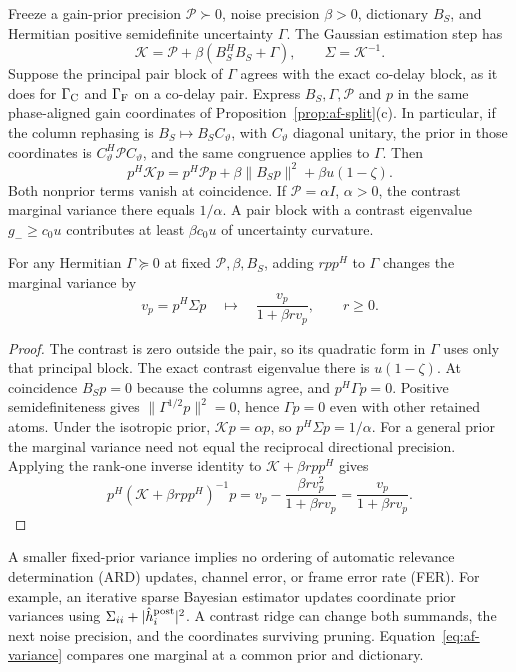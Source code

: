 \begin{afdmcor}
\label{cor:af-prior}
Freeze a gain-prior precision $\mathcal P\succ0$, noise precision
$\beta>0$, dictionary $B_S$, and Hermitian positive semidefinite
uncertainty $\Gamma$. The Gaussian estimation step has
\[
 \mathcal K=\mathcal P+\beta(B_S^HB_S+\Gamma),\qquad
 \Sigma=\mathcal K^{-1}.
\]
Suppose the principal pair block of $\Gamma$ agrees with the exact
co-delay block, as it does for $\Gamma_{\rm C}$ and $\Gamma_{\rm F}$
on a co-delay pair. Express $B_S,\Gamma,\mathcal P$ and $p$ in the
same phase-aligned gain coordinates of
Proposition~\ref{prop:af-split}(c). In particular, if the column
rephasing is $B_S\mapsto B_S C_\vartheta$, with $C_\vartheta$
diagonal unitary, the prior in those coordinates is
$C_\vartheta^H\mathcal P C_\vartheta$, and the same congruence
applies to $\Gamma$. Then
\[
 p^H\mathcal Kp=p^H\mathcal Pp+\beta\|B_Sp\|^2+\beta u(1-\zeta).
\]
Both nonprior terms vanish at coincidence. If
$\mathcal P=\alpha I$, $\alpha>0$, the contrast marginal variance
there equals $1/\alpha$. A pair block with a contrast eigenvalue
$g_-\ge c_0u$ contributes at least $\beta c_0u$ of uncertainty
curvature.

For any Hermitian $\Gamma\succeq0$ at fixed $\mathcal P,\beta,B_S$,
adding $rpp^H$ to $\Gamma$ changes the marginal variance by
\begin{equation}
 v_p=p^H\Sigma p
 \quad\longmapsto\quad
 \frac{v_p}{1+\beta r v_p},\qquad r\ge0 .
 \label{eq:af-variance}
\end{equation}
\end{afdmcor}

\begin{proof}
The contrast is zero outside the pair, so its quadratic form in
$\Gamma$ uses only that principal block. The exact contrast eigenvalue
there is $u(1-\zeta)$. At coincidence $B_Sp=0$ because the columns
agree, and $p^H\Gamma p=0$. Positive semidefiniteness gives
$\|\Gamma^{1/2}p\|^2=0$, hence $\Gamma p=0$ even with other retained
atoms. Under the isotropic prior, $\mathcal Kp=\alpha p$, so
$p^H\Sigma p=1/\alpha$. For a general prior the marginal variance
need not equal the reciprocal directional precision. Applying the
rank-one inverse identity to $\mathcal K+\beta rpp^H$ gives
\[
 p^H(\mathcal K+\beta rpp^H)^{-1}p
 =v_p-\frac{\beta r v_p^2}{1+\beta r v_p}
 =\frac{v_p}{1+\beta r v_p}.
\]
\end{proof}

A smaller fixed-prior variance implies no ordering of automatic
relevance determination (ARD) updates, channel error, or frame
error rate (FER). For example, an iterative sparse Bayesian
estimator updates coordinate prior variances using
$\Sigma_{ii}+|\hat h_i^{\rm post}|^2$. A contrast ridge can change
both summands, the next noise precision, and the coordinates
surviving pruning. Equation~\eqref{eq:af-variance} compares one
marginal at a common prior and dictionary.

